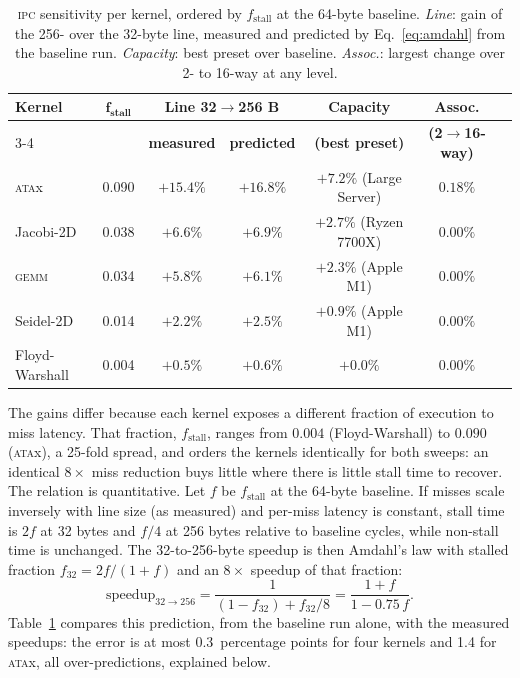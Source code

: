 \documentclass[12pt]{article}
\begin{document}
\begin{table}[!htb]
	\centering
	\caption{\textsc{ipc} sensitivity per kernel, ordered by \(f_{\text{stall}}\) at
	the 64-byte baseline. \textit{Line}: gain of the 256- over the 32-byte line,
	measured and predicted by Eq.~\ref{eq:amdahl} from the baseline run.
	\textit{Capacity}: best preset over baseline. \textit{Assoc.}: largest change
	over 2- to 16-way at any level.}
	\label{tab:sensitivity}
	\small
	\begin{tabular}{lcccccc}
		\toprule
		\textbf{Kernel} & \(\boldsymbol{f_{\text{stall}}}\) &
		\multicolumn{2}{c}{\textbf{Line 32\(\to\)256 B}} &
		\textbf{Capacity} & \textbf{Assoc.} \\
		\cmidrule(lr){3-4}
		& & \textbf{measured} & \textbf{predicted} & \textbf{(best preset)} & \textbf{(2\(\to\)16-way)} \\
		\midrule
		\textsc{ata}x  & 0.090 & \(+15.4\%\) & \(+16.8\%\) & \(+7.2\%\) (Large Server) & \(0.18\%\) \\
		Jacobi-2D      & 0.038 & \(+6.6\%\)  & \(+6.9\%\)  & \(+2.7\%\) (Ryzen 7700X)  & \(0.00\%\) \\
		\textsc{gemm}  & 0.034 & \(+5.8\%\)  & \(+6.1\%\)  & \(+2.3\%\) (Apple M1)     & \(0.00\%\) \\
		Seidel-2D      & 0.014 & \(+2.2\%\)  & \(+2.5\%\)  & \(+0.9\%\) (Apple M1)     & \(0.00\%\) \\
		Floyd-Warshall & 0.004 & \(+0.5\%\)  & \(+0.6\%\)  & \(+0.0\%\)                & \(0.00\%\) \\
		\bottomrule
	\end{tabular}
\end{table}

The gains differ because each kernel exposes a different fraction of execution
to miss latency. That fraction, \(f_{\text{stall}}\), ranges from \(0.004\)
(Floyd-Warshall) to \(0.090\) (\textsc{ata}x), a 25-fold spread, and orders the
kernels identically for both sweeps: an identical \(8\times\) miss reduction buys
little where there is little stall time to recover. The relation is
quantitative. Let \(f\) be \(f_{\text{stall}}\) at the 64-byte baseline. If
misses scale inversely with line size (as measured) and per-miss latency is
constant, stall time is \(2f\) at 32 bytes and \(f/4\) at 256 bytes relative to
baseline cycles, while non-stall time is unchanged. The 32-to-256-byte speedup
is then Amdahl's law with stalled fraction \(f_{32} = 2f/(1+f)\) and an
\(8\times\) speedup of that fraction:
\begin{equation}
	\mathrm{speedup}_{32\to256} = \frac{1}{(1 - f_{32}) + f_{32}/8}
	= \frac{1 + f}{1 - 0.75\,f}.
	\label{eq:amdahl}
\end{equation}
Table~\ref{tab:sensitivity} compares this prediction, from the baseline run
alone, with the measured speedups: the error is at most 0.3~percentage points for
four kernels and 1.4 for \textsc{ata}x, all over-predictions, explained below.
\end{document}
